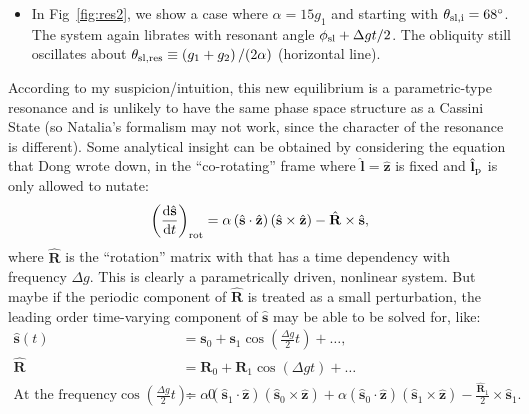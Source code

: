 \documentclass[11pt,
        usenames, %
        dvipsnames %
    ]{article}
\newcommand*{\rd}[2]{\frac{\mathrm{d}#1}{\mathrm{d}#2}}
\newcommand*{\bm}[1]{\boldsymbol{\mathbf{#1}}}
\newcommand*{\uv}[1]{\hat{\bm{#1}}}
\newcommand*{\p}[1]{\left(#1\right)}
\begin{document}
\begin{itemize}
    \item In Fig~\ref{fig:res2}, we show a case where $\alpha = 15g_1$ and
        starting with $\theta_{\rm sl, i} = 68^\circ$. The system again librates
        with resonant angle $\phi_{\rm sl} + \Delta g t / 2$. The obliquity
        still oscillates about $\theta_{\rm sl, res} \equiv \p{g_1 + g_2} /
        (2\alpha)$ (horizontal line).
\end{itemize}

According to my suspicion/intuition, this new equilibrium is a parametric-type
resonance and is unlikely to have the same phase space structure as a Cassini
State (so Natalia's formalism may not work, since the character of the resonance
is different). Some analytical insight can be obtained by considering the
equation that Dong wrote down, in the ``co-rotating'' frame where $\uv{l} =
\uv{z}$ is fixed and $\uv{l}_{\rm p}$ is only allowed to nutate:
\begin{equation}
    \p{\rd{\uv{s}}{t}}_{\rm rot} =
        \alpha \p{\uv{s} \cdot \uv{z}}\p{\uv{s} \times \uv{z}}
            - \uv{R} \times \uv{s},
\end{equation}
where $\uv{R}$ is the ``rotation'' matrix with that has a time dependency with
frequency $\Delta g$. This is clearly a parametrically driven, nonlinear system.
But maybe if the periodic component of $\uv{R}$ is treated as a small
perturbation, the leading order time-varying component of $\uv{s}$ may be able
to be solved for, like:
\begin{align}
    \uv{s}(t) &= \bm{s}_0 + \bm{s}_1\cos\p{\frac{\Delta g}{2}t} + \dots,\\
    \uv{R} &= \bm{R}_0 + \bm{R}_1\cos \p{\Delta gt} + \dots\\
    \text{At the frequency} \cos\p{ \frac{\Delta g}{2}t}:\quad 0 &=
        \alpha \p{\uv{s}_1 \cdot \uv{z}}\p{\uv{s}_0 \times \uv{z}}
        + \alpha \p{\uv{s}_0 \cdot \uv{z}}\p{\uv{s}_1 \times \uv{z}}
            - \frac{\uv{R}_1}{2} \times \uv{s}_1.
\end{align}
\end{document}
